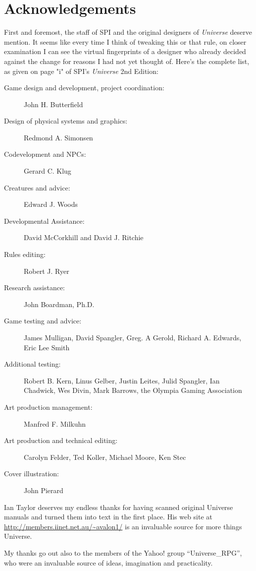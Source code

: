 
\chapter{Acknowledgements}
\label{cha:original-credits}

First and foremost, the staff of SPI and the original designers of
\emph{Universe} deserve mention.  It seems like every time I think of
tweaking this or that rule, on closer examination I can see the
virtual fingerprints of a designer who already decided against the
change for reasons I had not yet thought of.  Here's the complete
list, as given on page "i" of SPI's \emph{Universe} 2nd Edition:

\begin{description}
\item[Game design and development, project coordination:] John H.
  Butterfield
\item[Design of physical systems and graphics:]  Redmond A. Simonsen
\item[Codevelopment and NPCs:] Gerard C. Klug
\item[Creatures and advice:] Edward J. Woods
\item[Developmental Assistance:] David McCorkhill and David J. Ritchie
\item[Rules editing:] Robert J. Ryer
\item[Research assistance:] John Boardman, Ph.D.
\item[Game testing and advice:] James Mulligan, David Spangler,
  Greg. A Gerold, Richard A. Edwards, Eric Lee Smith
\item[Additional testing:] Robert B. Kern, Linus Gelber, Justin
  Leites, Julid Spangler, Ian Chadwick, Wes Divin, Mark Barrows, the
  Olympia Gaming Association
\item[Art production management:] Manfred F. Milkuhn
\item[Art production and technical editing:] Carolyn Felder, Ted
  Koller, Michael Moore, Ken Stec
\item[Cover illustration:] John Pierard
\end{description}


Ian Taylor deserves my endless thanks for having scanned original
Universe manuals and turned them into text in the first place.  His
web site at \url{http://members.iinet.net.au/~avalon1/}
is an invaluable source for more things Universe.

My thanks go out also to the members of the Yahoo! group
``Universe{\_}RPG'', who were an invaluable source of ideas, imagination
and practicality.


